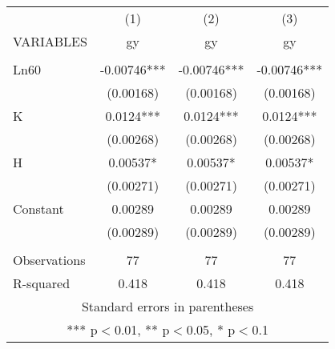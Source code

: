 \documentclass[]{article}
\begin{document}
\begin{tabular}{lccc} \hline
 & (1) & (2) & (3) \\
VARIABLES & gy & gy & gy \\ \hline
 &  &  &  \\
Ln60 & -0.00746*** & -0.00746*** & -0.00746*** \\
 & (0.00168) & (0.00168) & (0.00168) \\
K & 0.0124*** & 0.0124*** & 0.0124*** \\
 & (0.00268) & (0.00268) & (0.00268) \\
H & 0.00537* & 0.00537* & 0.00537* \\
 & (0.00271) & (0.00271) & (0.00271) \\
Constant & 0.00289 & 0.00289 & 0.00289 \\
 & (0.00289) & (0.00289) & (0.00289) \\
 &  &  &  \\
Observations & 77 & 77 & 77 \\
 R-squared & 0.418 & 0.418 & 0.418 \\ \hline
\multicolumn{4}{c}{ Standard errors in parentheses} \\
\multicolumn{4}{c}{ *** p$<$0.01, ** p$<$0.05, * p$<$0.1} \\
\end{tabular}
\end{document}
